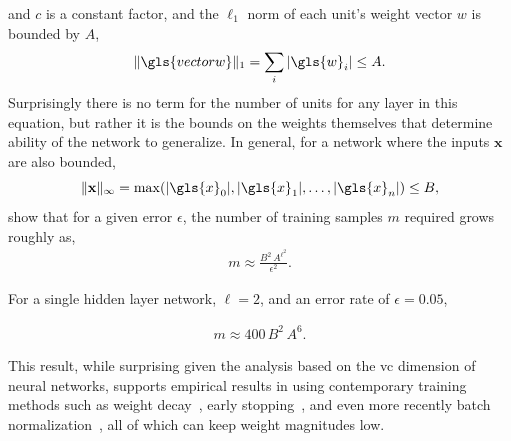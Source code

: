 \documentclass[thesis]{subfiles}
\begin{document}
    and $c$ is a constant factor, and the $\ell_1$ norm of each unit's weight vector $w$ is bounded by $A$, 
    \begin{equation}
    \|\gls{vectorw}\|_1 = \sum_i | \gls{w}_i | \leq A.
    \end{equation}
    Surprisingly there is no term for the number of units for any layer in this equation, but rather it is the bounds on the weights themselves that determine ability of the network to generalize. In general, for a network where the inputs $\mathbf{x}$ are also bounded,
    \begin{equation}
        \|\mathbf{x}\|_\infty = \max(|\gls{x}_0|, |\gls{x}_1|, \ldots, |\gls{x}_n|) \leq B,
    \end{equation}
    \citet{bartlett1997} show that for a given error $\epsilon$, the number of training samples $m$ required grows roughly as,
    \begin{align}
        m \approx \frac{B^2\,A^{\ell^2}}{\epsilon^2}.
    \end{align}
    
     For a single hidden layer network, \ie $\ell=2$, and an error rate of $\epsilon=0.05$, 
    
    \begin{align}
        m \approx 400\,B^2\,A^6.
    \end{align}
    
    This result, while surprising given the analysis based on the \gls{vc} dimension of neural networks, supports empirical results in using contemporary training methods such as weight decay~\citep{hinton1987learning}, early stopping~\citep{Bishop1995}, and even more recently batch normalization~\citep{Ioffe2015}, all of which can keep weight magnitudes low.
    
	
\end{document}

